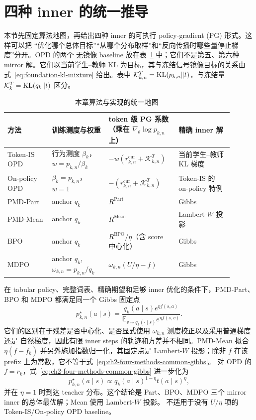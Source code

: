 \section{四种 inner 的统一推导}
\label{sec:ch2-four-methods}

本节先固定算法地图，再给出四种 inner 的可执行 policy-gradient (PG) 形式。这样可以把
“优化哪个总体目标”“从哪个分布取样”和“反向传播时哪些量停止梯度”分开。OPD 的两个
无镜像 baseline 放在表~\ref{tab:ch2-opd-baseline-map} 中；它们不是第五、第六种
mirror 解。它们以当前学生--教师 KL 为目标，其与冻结信号镜像目标的关系由式~\eqref{eq:foundation-kl-mixture} 给出。表中 $\mathcal K_{k,n}^{T}=\operatorname{KL}(p_{k,n}\Vert t)$，与冻结量 $\mathcal K_k^T=\operatorname{KL}(q_k\Vert t)$ 区分。

\begin{table}[ht]
\centering
\caption{本章算法与实现的统一地图}
\label{tab:ch2-opd-baseline-map}
\begin{tabular}{p{0.18\linewidth}p{0.23\linewidth}p{0.27\linewidth}p{0.22\linewidth}}
\toprule
方法 & 训练测度与权重 & token 级 PG 系数（乘在 $\nabla_\theta\log p_{k,n}$ 上） & 精确 inner 解 \\
\midrule
Token-IS OPD & 行为测度 $\beta_k$，$w= p_{k,n}/\beta_k$ & $-w(r_{k,n}^{\mathrm{cur}}+\mathcal K_{k,n}^{T})$ & 当前学生--教师 KL 梯度 \\
On-policy OPD & $\beta_k= p_{k,n}$，$w=1$ & $-(r_{k,n}^{\mathrm{cur}}+\mathcal K_{k,n}^{T})$ & Token-IS 的 on-policy 特例 \\
PMD-Part & anchor $ q_k$ & $R^{\mathrm{Part}}$ & Gibbs \\
PMD-Mean & anchor $ q_k$ & $R^{\mathrm{Mean}}$ & Lambert-$W$ 投影 \\
BPO & anchor $ q_k$ & $R^{\mathrm{BPO}}/\eta$（含 score 中心化） & Gibbs \\
MDPO & anchor $ q_k$,$\omega_{k,n}= p_{k,n}/ q_k$ & $\omega_{k,n}(U/\eta-f)$ & Gibbs \\
\bottomrule
\end{tabular}
\end{table}

在 tabular policy、完整词表、精确期望和足够 inner 优化的条件下，PMD-Part、BPO
和 MDPO 都满足同一个 Gibbs 固定点
\begin{equation}
\label{eq:ch2-four-methods-common-gibbs}
 p_{k,n}^{\star}(a\mid s)
=\frac{ q_k(a\mid s)e^{\eta f(s,a)}}{\mathbb E_{v\sim q_k(\cdot\mid s)}e^{\eta f(s,v)}}.
\end{equation}
它们的区别在于残差是否中心化、是否显式使用 $\omega_{k,n}$ 测度校正以及采用普通梯度还是
自然梯度，因此有限 inner steps 的轨迹和方差并不相同。PMD-Mean 拟合
$\eta(f-\bar f_k)$ 并另外施加指数归一化，其固定点是 Lambert-$W$ 投影；除非
$f$ 在该 prefix 上为常数，它不等于式~\eqref{eq:ch2-four-methods-common-gibbs}。
对 OPD 的 $f=r_k$，式~\eqref{eq:ch2-four-methods-common-gibbs} 进一步化为
\begin{equation}
 p_{k,n}^{\star}(a\mid s)
\propto  q_k(a\mid s)^{1-\eta} t(a\mid s)^{\eta},
\end{equation}
并在 $\eta=1$ 时到达 teacher 分布。这个结论是 Part、BPO、MDPO 三个 mirror inner 的总体最优解；Mean 使用 Lambert-$W$ 投影。
不适用于没有 $U/\eta$ 项的 Token-IS/On-policy OPD baseline。

